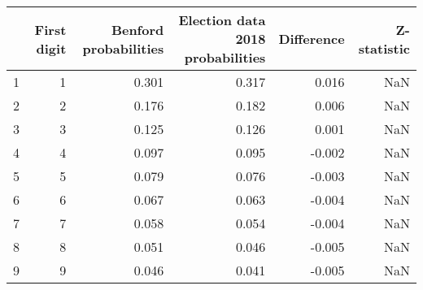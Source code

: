 \begin{tabular}{lrrrrr}
\toprule
 & First digit & Benford probabilities & Election data 2018 probabilities & Difference & Z-statistic \\
\midrule
1 & 1 & 0.301 & 0.317 & 0.016 & NaN \\
2 & 2 & 0.176 & 0.182 & 0.006 & NaN \\
3 & 3 & 0.125 & 0.126 & 0.001 & NaN \\
4 & 4 & 0.097 & 0.095 & -0.002 & NaN \\
5 & 5 & 0.079 & 0.076 & -0.003 & NaN \\
6 & 6 & 0.067 & 0.063 & -0.004 & NaN \\
7 & 7 & 0.058 & 0.054 & -0.004 & NaN \\
8 & 8 & 0.051 & 0.046 & -0.005 & NaN \\
9 & 9 & 0.046 & 0.041 & -0.005 & NaN \\
\bottomrule
\end{tabular}

